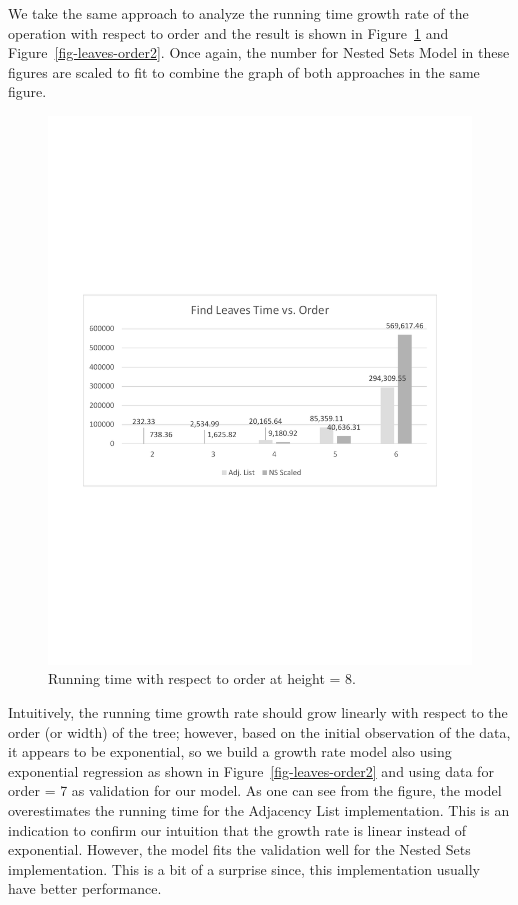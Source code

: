 We take the same approach to analyze the running time growth rate of the operation with respect to order and the result is shown in Figure~\ref{fig-leaves-order1} and Figure~\ref{fig-leaves-order2}. Once again, the number for Nested Sets Model in these figures are scaled to fit to combine the graph of both approaches in the same figure.

\begin{figure}
\begin{center}
\includegraphics[width=6in]{images/eval/leaves/order/col.pdf}
\caption{Running time with respect to order at height = 8.\label{fig-leaves-order1}}
\end{center}
\end{figure}

Intuitively, the running time growth rate should grow linearly with respect to the order (or width) of the tree; however, based on the initial observation of the data, it appears to be exponential, so we build a growth rate model also using exponential regression as shown in Figure~\ref{fig-leaves-order2} and using data for order = 7 as validation for our model. As one can see from the figure, the model overestimates the running time for the Adjacency List implementation. This is an indication to confirm our intuition that the growth rate is linear instead of exponential. However, the model fits the validation well for the Nested Sets implementation. This is a bit of a surprise since, this implementation usually have better performance.

